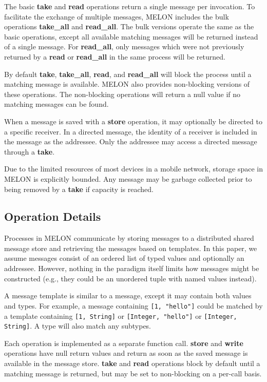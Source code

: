 \documentclass[lnicst]{svmultln}
\begin{document}
The basic \textbf{take} and \textbf{read} operations return a single message per invocation. To facilitate the exchange of multiple messages, MELON includes the bulk operations \textbf{take\_all} and \textbf{read\_all}. The bulk versions operate the same as the basic operations, except all available matching messages will be returned instead of a single message. For \textbf{read\_all}, only messages which were not previously returned by a \textbf{read} or \textbf{read\_all} in the same process will be returned.

By default \textbf{take}, \textbf{take\_all}, \textbf{read}, and \textbf{read\_all} will block the process until a matching message is available. MELON also provides non-blocking versions of these operations. The non-blocking operations will return a null value if no matching messages can be found.

When a message is saved with a \textbf{store} operation, it may optionally be directed to a specific receiver. In a directed message, the identity of a receiver is included in the message as the addressee. Only the addressee may access a directed message through a \textbf{take}.

Due to the limited resources of most devices in a mobile network, storage space in MELON is explicitly bounded. Any message may be garbage collected prior to being removed by a \textbf{take} if capacity is reached.

\subsection{Operation Details}

Processes in MELON communicate by storing messages to a distributed shared message store and retrieving the messages based on templates. In this paper, we assume messages consist of an ordered list of typed values and optionally an addressee. However, nothing in the paradigm itself limits how messages might be constructed (e.g., they could be an unordered tuple with named values instead).

A message template is similar to a message, except it may contain both values and types. For example, a message containing \texttt{[1, "hello"]} could be matched by a template containing \texttt{[1, String]} or \texttt{[Integer, "hello"]} or \texttt{[Integer, String]}. A type will also match any subtypes.

Each operation is implemented as a separate function call. \textbf{store} and \textbf{write} operations have null return values and return as soon as the saved message is available in the message store. \textbf{take} and \textbf{read} operations block by default until a matching message is returned, but may be set to non-blocking on a per-call basis.
\end{document}
